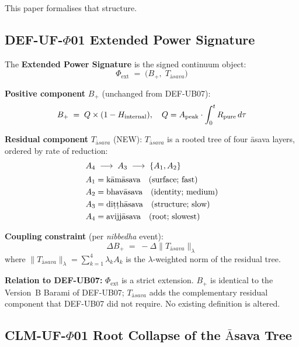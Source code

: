 \documentclass[12pt, a4paper]{article}
\providecommand{\Phiext}{\Phi_{\mathrm{ext}}}
\providecommand{\Hint}{H_{\mathrm{internal}}}
\providecommand{\Bplus}{B_{+}}
\providecommand{\Tasava}{T_{\bar{\mathrm{a}}sava}}
\providecommand{\Tasava}{\mathcal{T}_{\!\mathrm{\bar{a}sava}}}
\begin{document}
This paper formalises that structure.

\subsection{DEF-UF-\texorpdfstring{$\Phi$}{Phi}01 \quad
         Extended Power Signature}


\begin{formalbox}[title={DEF-UF-$\Phi$01: Extended Power Signature
  $\Phiext$}]
The \textbf{Extended Power Signature} is the signed continuum object:
\[
  \Phiext \;=\; \bigl(\Bplus,\;\Tasava\bigr)
\]

\textbf{Positive component} $\Bplus$ (unchanged from DEF-UB07):
\[
  \Bplus \;=\; Q \times (1 - \Hint),
  \quad Q = A_{\rm peak}\cdot\int_0^t R_{\rm pure}\,d\tau
\]

\textbf{Residual component} $\Tasava$ (NEW):
$\Tasava$ is a rooted tree of four \={a}sava layers,
ordered by rate of reduction:
\begin{align*}
  &A_4 \;\longrightarrow\; A_3 \;\longrightarrow\; \{A_1, A_2\}\\[2pt]
  &A_1 = \text{k\={a}m\={a}sava} \quad\text{(surface; fast)}\\
  &A_2 = \text{bhav\={a}sava} \quad\text{(identity; medium)}\\
  &A_3 = \text{di\d{t}\d{t}h\={a}sava} \quad\text{(structure; slow)}\\
  &A_4 = \text{avijj\={a}sava} \quad\text{(root; slowest)}
\end{align*}

\textbf{Coupling constraint} (per \textit{nibbedha} event):
\[
  \Delta \Bplus \;=\; -\Delta\bigl\|\Tasava\bigr\|_{\lambda}
\]
where $\|\Tasava\|_{\lambda} = \sum_{k=1}^{4} \lambda_k A_k$
is the $\lambda$-weighted norm of the residual tree.

\textbf{Relation to DEF-UB07:}
$\Phiext$ is a strict extension. $\Bplus$ is identical to
the Version~B Barami of DEF-UB07; $\Tasava$ adds the
complementary residual component that DEF-UB07 did not require.
No existing definition is altered.
\end{formalbox}

\subsection{CLM-UF-\texorpdfstring{$\Phi$}{Phi}01 \quad
         Root Collapse of the \texorpdfstring{$\bar{\text{A}}$}{A}sava Tree}
\end{document}

